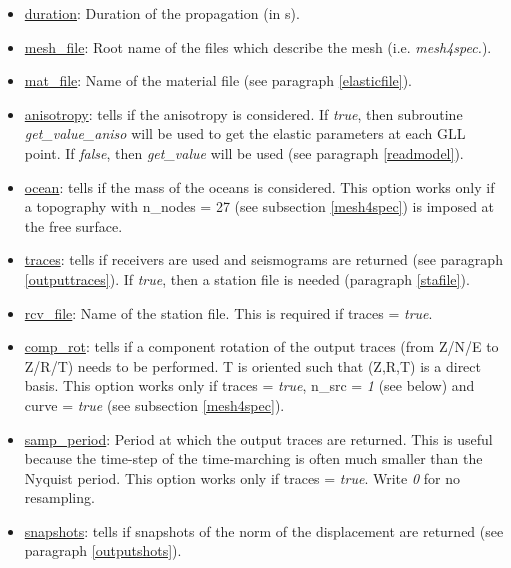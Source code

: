 \renewcommand{\labelitemii}{}
\begin{itemize}[itemsep=10pt]

\item\underline{duration}: Duration of the propagation (in s).

\item\underline{mesh\_file}: Root name of the files which describe the mesh (i.e. \textit{mesh4spec.}).

\item\underline{mat\_file}: Name of the material file (see paragraph \ref{elasticfile}).

\item\underline{anisotropy}: tells if the anisotropy is considered. If \textit{true},
then subroutine \textit{get\_value\_aniso} will be used to get the elastic parameters at each GLL point. If
\textit{false}, then \textit{get\_value} will be used (see paragraph \ref{readmodel}).

\item\underline{ocean}: tells if the mass of the oceans is considered. This option works only if a
topography with n\_nodes = 27 (see subsection \ref{mesh4spec}) is imposed at the free surface.

\item\underline{traces}: tells if receivers are used and seismograms are returned (see paragraph
\ref{outputtraces}). If \textit{true}, then a station file is needed (paragraph \ref{stafile}).

\item\underline{rcv\_file}: Name of the station file. This is required if traces = \textit{true}.

\item\underline{comp\_rot}: tells if a component rotation of the output traces (from Z/N/E to Z/R/T) needs to
be performed. T is oriented such that (Z,R,T) is a direct basis. This option works only if traces = \textit{true}, n\_src = \textit{1} (see below) and curve =
\textit{true} (see subsection \ref{mesh4spec}).

\item\underline{samp\_period}: Period at which the output traces are returned. This is useful because the
time-step of the time-marching is often much smaller than the Nyquist period. This option works only if traces
= \textit{true}. Write \textit{0} for no resampling.

\item\underline{snapshots}: tells if snapshots of the norm of the displacement are returned (see paragraph
\ref{outputshots}).


\end{itemize}
